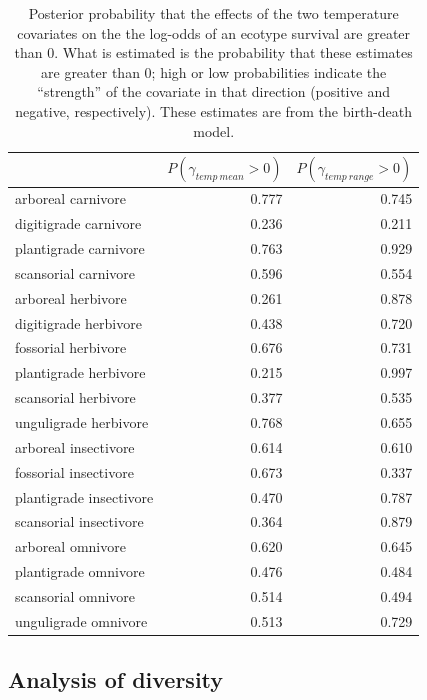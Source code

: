 \documentclass[12pt,letterpaper]{article}
\begin{document}
\begin{table}[ht]
  \centering
  \caption[Posterior probablity of effects of temperature on survival]{Posterior probability that the effects of the two temperature covariates on the the log-odds of an ecotype survival are greater than 0. What is estimated is the probability that these estimates are greater than 0; high or low probabilities indicate the ``strength'' of the covariate in that direction (positive and negative, respectively). These estimates are from the birth-death model.}
  \label{tab:surv_temp}
  \begin{tabular}{ l r r }
    \hline
    & \(P(\gamma_{temp\ mean} > 0)\) & \(P(\gamma_{temp\ range} > 0)\) \\ 
    \hline
    arboreal carnivore & 0.777 & 0.745 \\ 
    digitigrade carnivore & 0.236 & 0.211 \\ 
    plantigrade carnivore & 0.763 & 0.929 \\ 
    scansorial carnivore & 0.596 & 0.554 \\ 
    arboreal herbivore & 0.261 & 0.878 \\ 
    digitigrade herbivore & 0.438 & 0.720 \\ 
    fossorial herbivore & 0.676 & 0.731 \\ 
    plantigrade herbivore & 0.215 & 0.997 \\ 
    scansorial herbivore & 0.377 & 0.535 \\ 
    unguligrade herbivore & 0.768 & 0.655 \\ 
    arboreal insectivore & 0.614 & 0.610 \\ 
    fossorial insectivore & 0.673 & 0.337 \\ 
    plantigrade insectivore & 0.470 & 0.787 \\ 
    scansorial insectivore & 0.364 & 0.879 \\ 
    arboreal omnivore & 0.620 & 0.645 \\ 
    plantigrade omnivore & 0.476 & 0.484 \\ 
    scansorial omnivore & 0.514 & 0.494 \\ 
    unguligrade omnivore & 0.513 & 0.729 \\ 
    \hline
  \end{tabular}
\end{table}





\subsection*{Analysis of diversity}
\end{document}
